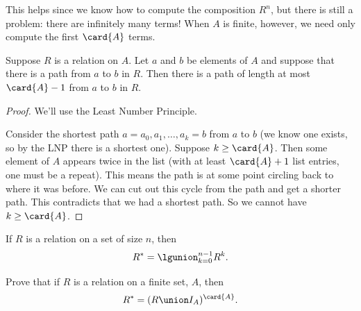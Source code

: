 This helps since we know how to compute the composition $R^n$, but there
is still a problem: there are infinitely many terms!  When $A$ is finite,
however, we need only compute the first $\card{A}$ terms.

\begin{lemma}
Suppose $R$ is a relation on $A$.  Let $a$ and $b$ be elements of $A$ and
suppose that there is a path from $a$ to $b$ in $R$.  Then there is a path
of length at most $\card{A}-1$ from $a$ to $b$ in $R$.
\end{lemma}

\begin{proof}
We'll use the Least Number Principle.

Consider the shortest path $a=a_0,a_1,\dots,a_k=b$ from $a$ to $b$ (we
know one exists, so by the LNP there is a shortest one).  Suppose $k \ge
\card{A}$.  Then some element of $A$ appears twice in the list (with at
least $\card{A}+1$ list entries, one must be a repeat).  This means the
path is at some point circling back to where it was before.  We can cut
out this cycle from the path and get a shorter path.  This contradicts
that we had a shortest path.  So we cannot have $k \ge \card{A}$.
\end{proof}

\begin{corollary}
If $R$ is a relation on a set of size $n$, then
\[
R^* = \lgunion_{k=0}^{n-1} R^k.
\]
\end{corollary}

\begin{problem}
Prove that if $R$ is a relation on a finite set, $A$, then
\[
R^* = (R \union I_A)^{\card{A}}.
\]
\end{problem}

